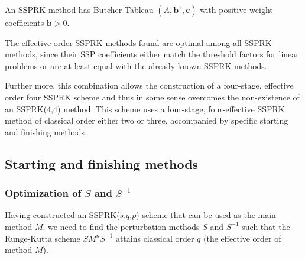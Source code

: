 \begin{lemma}\label{lem:ssp_pos_coef}\cite{Ruuth2002}
  An SSPRK method
  has Butcher Tableau \( (A,\textbf{b}^{\texttt{T}},\textbf{c}) \) with positive weight coefficients \( \textbf{b} > 0 \).
\end{lemma}


The effective order SSPRK methods found are optimal among all SSPRK methods, since their SSP coefficients either match the threshold factors for linear problems  or are at least equal with the already known SSPRK methods. 


Further more, this combination allows the construction of a
four-stage, effective order four SSPRK scheme and thus in some sense overcomes the
non-existence of an SSPRK(\( 4 \),\( 4 \)) method.  This scheme uses a
four-stage, four-effective SSPRK method of classical order either two
or three, accompanied by specific starting and finishing methods.



\subsection{Starting and finishing methods}\label{subsection3.2}


\subsubsection{Optimization of $ S $ and $ S^{-1} $}\label{subsection3.2.1}

Having constructed an SSPRK(\( s \),\( q \),\( p \)) scheme that can
be used as the main method \( M \), we need to find the perturbation
methods \( S \) and \( S^{-1} \) such that the Runge-Kutta scheme \(
SM^{n}S^{-1} \) attains classical order $q$ (the effective order of
method \( M \)).

